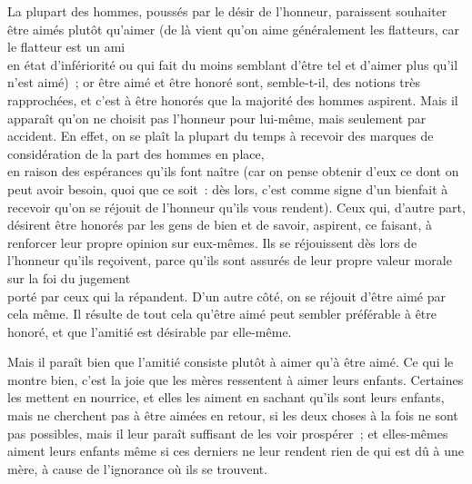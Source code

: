 \documentclass[french,twoside]{book} %
\begin{document}
La plupart des hommes, poussés par le désir de l’honneur, paraissent souhaiter être aimés plutôt qu’aimer (de là vient qu’on aime généralement les flatteurs, car le flatteur est un ami \\
en état d’infériorité ou qui fait du moins semblant d’être tel et d’aimer plus qu’il n’est aimé) ; or être aimé et être honoré sont, semble-t-il, des notions très rapprochées, et c’est à être honorés que la majorité des hommes aspirent. Mais il apparaît qu’on ne choisit pas l’honneur pour lui-même, mais seulement par accident. En effet, on se plaît la plupart du temps à recevoir des marques de considération de la part des hommes en place, \\
en raison des espérances qu’ils font naître (car on pense obtenir d’eux ce dont on peut avoir besoin, quoi que ce soit : dès lors, c’est comme signe d’un bienfait à recevoir qu’on se réjouit de l’honneur qu’ils vous rendent). Ceux qui, d’autre part, désirent être honorés par les gens de bien et de savoir, aspirent, ce faisant, à renforcer leur propre opinion sur eux-mêmes. Ils se réjouissent dès lors de l’honneur qu’ils reçoivent, parce qu’ils sont assurés de leur propre valeur morale sur la foi du jugement \\
porté par ceux qui la répandent. D’un autre côté, on se réjouit d’être aimé par cela même. Il résulte de tout cela qu’être aimé peut sembler préférable à être honoré, et que l’amitié est désirable par elle-même.\par
Mais il paraît bien que l’amitié consiste plutôt à aimer qu’à être aimé. Ce qui le montre bien, c’est la joie que les mères ressentent à aimer leurs enfants. Certaines les mettent en nourrice, et elles les aiment en sachant qu’ils sont leurs enfants, \\
mais ne cherchent pas à être aimées en retour, si les deux choses à la fois ne sont pas possibles, mais il leur paraît suffisant de les voir prospérer ; et elles-mêmes aiment leurs enfants même si ces derniers ne leur rendent rien de qui est dû à une mère, à cause de l’ignorance où ils se trouvent.
\end{document}
